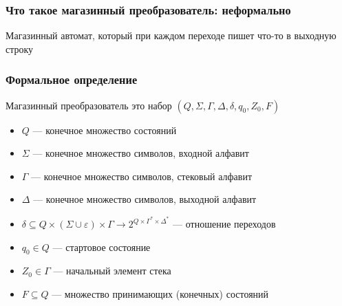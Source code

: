 \documentclass{beamer}
\begin{document}
\begin{frame}[fragile]
  \transwipe[direction=90]
  \frametitle{Что такое магазинный преобразователь: неформально}
 \begin{center}
    Магазинный автомат, который при каждом переходе пишет что-то в выходную строку
 \end{center}
\end{frame}


\begin{frame}[fragile]
  \transwipe[direction=90]
  \frametitle{Формальное определение}

  \begin{center}
    Магазинный преобразователь это набор $(Q, \Sigma, \Gamma, \Delta, \delta, q_0, Z_0, F)$
  \end{center}
  \begin{itemize}
    \item $Q$ --- конечное множество состояний
    \item $\Sigma$ --- конечное множество символов, входной алфавит
    \item $\Gamma$ --- конечное множество символов, стековый алфавит
    \item $\Delta$ --- конечное множество символов, выходной алфавит
    \item $\delta \subseteq Q \times (\Sigma \cup \varepsilon) \times \Gamma \rightarrow 2^{Q \times \Gamma^* \times \Delta^*}$ --- отношение переходов
    \item $q_0 \in Q$ --- стартовое состояние
    \item $Z_0 \in \Gamma$ --- начальный элемент стека
    \item $F \subseteq Q$ --- множество принимающих (конечных) состояний
  \end{itemize}
\end{frame}
\end{document}
